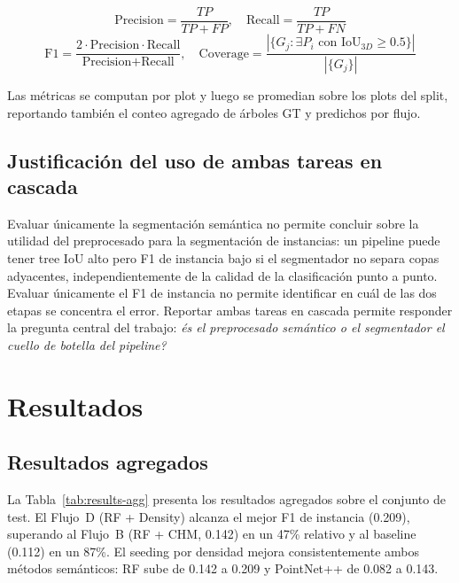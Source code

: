 \documentclass[runningheads]{llncs}
\begin{document}
\begin{equation}
\text{Precision} = \frac{TP}{TP + FP}, \quad
\text{Recall} = \frac{TP}{TP + FN}
\end{equation}
\begin{equation}
\text{F1} = \frac{2 \cdot \text{Precision} \cdot \text{Recall}}{\text{Precision} + \text{Recall}}, \quad
\text{Coverage} = \frac{|\{G_j : \exists P_i \text{ con } \text{IoU}_{3D} \geq 0.5\}|}{|\{G_j\}|}
\end{equation}

Las m\'etricas se computan por plot y luego se promedian sobre los plots del split, reportando tambi\'en el conteo agregado de \'arboles GT y predichos por flujo.

\subsection{Justificaci\'on del uso de ambas tareas en cascada}

Evaluar \'unicamente la segmentaci\'on sem\'antica no permite concluir sobre la utilidad del preprocesado para la segmentaci\'on de instancias: un pipeline puede tener tree IoU alto pero F1 de instancia bajo si el segmentador no separa copas adyacentes, independientemente de la calidad de la clasificaci\'on punto a punto. Evaluar \'unicamente el F1 de instancia no permite identificar en cu\'al de las dos etapas se concentra el error. Reportar ambas tareas en cascada permite responder la pregunta central del trabajo: \emph{\'es el preprocesado sem\'antico o el segmentador el cuello de botella del pipeline?}

\section{Resultados}\label{sec:results}

\subsection{Resultados agregados}

La Tabla~\ref{tab:results-agg} presenta los resultados agregados sobre el conjunto de test. El Flujo~D (RF + Density) alcanza el mejor F1 de instancia (0.209), superando al Flujo~B (RF + CHM, 0.142) en un 47\% relativo y al baseline (0.112) en un 87\%. El seeding por densidad mejora consistentemente ambos m\'etodos sem\'anticos: RF sube de 0.142 a 0.209 y PointNet++ de 0.082 a 0.143.
\end{document}
